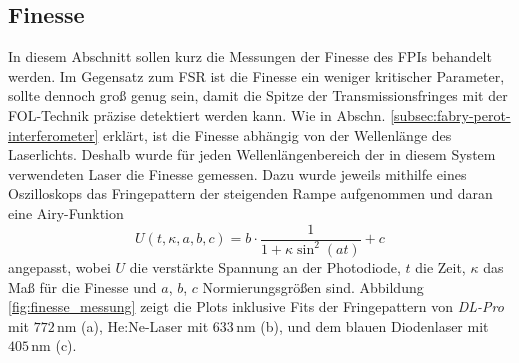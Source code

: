\subsection{Finesse}\label{subsec:finesse}
In diesem Abschnitt sollen kurz die Messungen der Finesse des FPIs
behandelt werden. Im Gegensatz zum FSR ist die Finesse ein weniger
kritischer Parameter, sollte dennoch groß genug sein, damit die Spitze der
Transmissionsfringes mit der FOL-Technik präzise detektiert werden
kann. Wie in Abschn. \ref{subsec:fabry-perot-interferometer} erklärt, ist
die Finesse abhängig von der Wellenlänge des Laserlichts. Deshalb wurde für jeden
Wellenlängenbereich der in diesem System verwendeten Laser die Finesse
gemessen. Dazu wurde jeweils mithilfe eines Oszilloskops das Fringepattern der
steigenden Rampe aufgenommen und daran eine Airy-Funktion
\begin{equation}\label{eq:finesse_messung_01}
	U(t,\kappa,a,b,c) = b\cdot\frac{1}{1+\kappa \sin^2{(at)}}+c
\end{equation}
angepasst, wobei $U$ die verstärkte Spannung an der Photodiode, $t$ die Zeit,
$\kappa$ das Maß für die Finesse und $a$, $b$, $c$ Normierungsgrößen sind.
Abbildung \ref{fig:finesse_messung} zeigt die Plots inklusive Fits der
Fringepattern von \textit{DL-Pro} mit $772\,$nm (a), He:Ne-Laser mit $633\,$nm (b), und dem
blauen Diodenlaser mit $405\,$nm (c).

